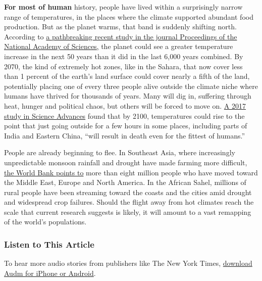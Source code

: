 \textbf{For most of human} history, people have lived within a
surprisingly narrow range of temperatures, in the places where the
climate supported abundant food production. But as the planet warms,
that band is suddenly shifting north. According to
\href{https://www.pnas.org/content/117/21/11350}{a pathbreaking recent
study in the journal Proceedings of the National Academy of Sciences,}
the planet could see a greater temperature increase in the next 50 years
than it did in the last 6,000 years combined. By 2070, the kind of
extremely hot zones, like in the Sahara, that now cover less than 1
percent of the earth's land surface could cover nearly a fifth of the
land, potentially placing one of every three people alive outside the
climate niche where humans have thrived for thousands of years. Many
will dig in, suffering through heat, hunger and political chaos, but
others will be forced to move on.
\href{https://advances.sciencemag.org/content/3/8/e1603322}{A 2017 study
in Science Advances} found that by 2100, temperatures could rise to the
point that just going outside for a few hours in some places, including
parts of India and Eastern China, ``will result in death even for the
fittest of humans.''

People are already beginning to flee. In Southeast Asia, where
increasingly unpredictable monsoon rainfall and drought have made
farming more difficult,
\href{https://www.worldbank.org/en/news/infographic/2018/03/19/groundswell---preparing-for-internal-climate-migration}{the
World Bank points to} more than eight million people who have moved
toward the Middle East, Europe and North America. In the African Sahel,
millions of rural people have been streaming toward the coasts and the
cities amid drought and widespread crop failures. Should the flight away
from hot climates reach the scale that current research suggests is
likely, it will amount to a vast remapping of the world's populations.

\hypertarget{listen-to-this-article}{%
\subsubsection{Listen to This Article}\label{listen-to-this-article}}

To hear more audio stories from publishers like The New York Times,
\href{https://www.audm.com/}{download Audm for iPhone or Android}.

